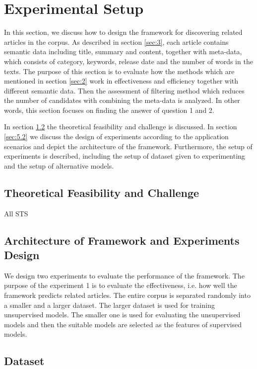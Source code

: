 \section{Experimental Setup}
\label{sec:5}
In this section, we discuss how to design the framework for discovering related articles in the corpus. As described in section \ref{sec:3}, each article contains semantic data including title, summary and content, together with meta-data, which consists of category, keywords, release date and the number of words in the texts. The purpose of this section is to evaluate how the methods which are mentioned in section \ref{sec:2} work in effectiveness and efficiency together with different semantic data. Then the assessment of filtering method which reduces the number of candidates with combining the meta-data is analyzed. In other words, this section focuses on finding the answer of question 1 and 2.

In section \ref{sec:5.1} the theoretical feasibility and challenge is discussed. In section \ref{sec:5.2} we discuss the design of experiments according to the application scenarios and depict the architecture of the framework. Furthermore, the setup of experiments is described, including the setup of dataset given to experimenting and the setup of alternative models. 

\subsection{Theoretical Feasibility and Challenge}

All STS

\subsection{Architecture of Framework and Experiments Design}
\label{sec:5.1}
We design two experiments to evaluate the performance of the framework. The purpose of the experiment 1 is to evaluate the effectiveness, i.e. how well the framework predicts related articles. The entire corpus is separated randomly into a smaller and a larger dataset. The larger dataset is used for training unsupervised models. The smaller one is used for evaluating the unsupervised models and then the suitable models are selected as the features of supervised models. 

\subsection{Dataset}

